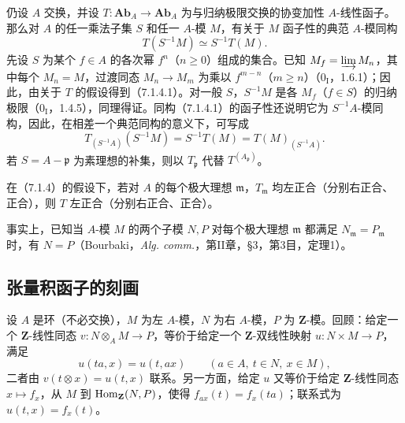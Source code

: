 仍设 $A$ 交换，并设 $T:\mathbf{Ab}_A\to\mathbf{Ab}_A$ 为与归纳极限交换的协变加性 $A$-线性函子。那么对 $A$ 的任一乘法子集 $S$ 和任一 $A$-模 $M$，有关于 $M$ 函子性的典范 $A$-模同构
\begin{equation}
 T(S^{-1}M)\simeq S^{-1}T(M).\tag{7.1.4.1}
\end{equation}
先设 $S$ 为某个 $f\in A$ 的各次幂 $f^n$（$n\geq0$）组成的集合。已知 $M_f=\varinjlim M_n$，其中每个 $M_n=M$，过渡同态 $M_n\to M_m$ 为乘以 $f^{m-n}$（$m\geq n$）（$0_{\mathrm I}$，1.6.1）；因此，由关于 $T$ 的假设得到（7.1.4.1）。对一般 $S$，$S^{-1}M$ 是各 $M_f$（$f\in S$）的归纳极限（$0_{\mathrm I}$，1.4.5），同理得证。同构（7.1.4.1）的函子性还说明它为 $S^{-1}A$-模同构，因此，在相差一个典范同构的意义下，可写成
\begin{equation}
 T_{(S^{-1}A)}(S^{-1}M)=S^{-1}T(M)=T(M)_{(S^{-1}A)}.
 \tag{7.1.4.2}
\end{equation}
若 $S=A-\mathfrak p$ 为素理想的补集，则以 $T_{\mathfrak p}$ 代替 $T^{(A_{\mathfrak p})}$。

在（7.1.4）的假设下，若对 $A$ 的每个极大理想 $\mathfrak m$，$T_{\mathfrak m}$ 均左正合（分别右正合、正合），则 $T$ 左正合（分别右正合、正合）。

事实上，已知当 $A$-模 $M$ 的两个子模 $N,P$ 对每个极大理想 $\mathfrak m$ 都满足 $N_{\mathfrak m}=P_{\mathfrak m}$ 时，有 $N=P$（Bourbaki，\textit{Alg. comm.}，第II章，§3，第3目，定理1）。

\subsection{张量积函子的刻画}

设 $A$ 是环（不必交换），$M$ 为左 $A$-模，$N$ 为右 $A$-模，$P$ 为 $\mathbf Z$-模。回顾：给定一个 $\mathbf Z$-线性同态 $v:N\otimes_A M\to P$，等价于给定一个 $\mathbf Z$-双线性映射 $u:N\times M\to P$，满足
\[
 u(ta,x)=u(t,ax)\qquad(a\in A,\ t\in N,\ x\in M),
\]
二者由 $v(t\otimes x)=u(t,x)$ 联系。另一方面，给定 $u$ 又等价于给定 $\mathbf Z$-线性同态 $x\mapsto f_x$，从 $M$ 到 $\operatorname{Hom}_{\mathbf Z}(N,P)$，使得 $f_{ax}(t)=f_x(ta)$；联系式为 $u(t,x)=f_x(t)$。


